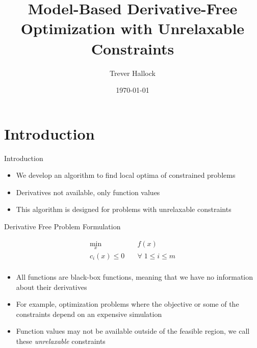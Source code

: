 \documentclass{beamer}
\begin{document}
\title{Model-Based Derivative-Free Optimization with Unrelaxable Constraints}   
\author{Trever Hallock} 
\date{\today} 

\frame{\titlepage} 

\section{Introduction}

\begin{frame}{Introduction}
	\begin{itemize}
		\item We develop an algorithm to find local optima of constrained problems
		\item Derivatives not available, only function values
		\item This algorithm is designed for problems with unrelaxable constraints
	\end{itemize}
\end{frame}


\begin{frame}{Derivative Free Problem Formulation}
\begin{center}
\label{Problem}
\begin{align*}
\min_x & \quad f(x) \\
  c_i(x) \le 0   & \quad \forall \; 1 \le i \le m \\
\end{align*}
\end{center}
	\begin{itemize}
		\item All functions are black-box functions, meaning that we have no information about their derivatives
		\item For example, optimization problems where the objective or some of the constraints depend on an expensive simulation
		\item Function values may not be available outside of the feasible region, 
		we call these \emph{unrelaxable} constraints
	\end{itemize}
\end{frame}
\end{document}
